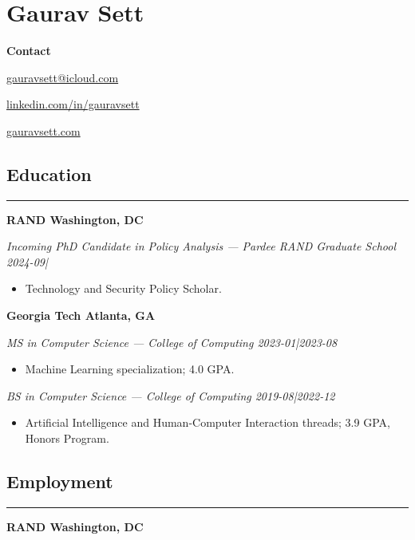 \documentclass{article}
\newcommand{\headingOne}[1]{
    \subsection*{#1} \hrule
    \vspace*{6pt}
}
\newcommand{\headingTwo}[2]{
    \vspace*{6pt}
    \textbf{#1 \hfill #2}
}
\newcommand{\headingThree}[2]{
    \vspace*{2pt}
    \textsl{#1 \hfill #2}
}
\begin{document}
\section*{Gaurav Sett}

\textbf{Contact}
\begin{itemize*}[label=$|$]
    \item \href{mailto:gauravsett@icloud.com}{gauravsett@icloud.com}
    \item \href{https://linkedin.com/in/gauravsett}{linkedin.com/in/gauravsett}
    \item \href{https://gauravsett.com}{gauravsett.com}
\end{itemize*}


\headingOne{Education}


\headingTwo{RAND}{Washington, DC}

\headingThree{Incoming PhD Candidate in Policy Analysis — Pardee RAND Graduate School}{2024-09|}
\begin{itemize}
    \item Technology and Security Policy Scholar.
\end{itemize}


\headingTwo{Georgia Tech}{Atlanta, GA}

\headingThree{MS in Computer Science — College of Computing}{2023-01|2023-08}
\begin{itemize}
    \item Machine Learning specialization; 4.0 GPA.
\end{itemize}

\headingThree{BS in Computer Science — College of Computing}{2019-08|2022-12}
\begin{itemize}
    \item Artificial Intelligence and Human-Computer Interaction threads; 3.9 GPA, Honors Program.
\end{itemize}



\headingOne{Employment}


\headingTwo{RAND}{Washington, DC}

\end{document}
